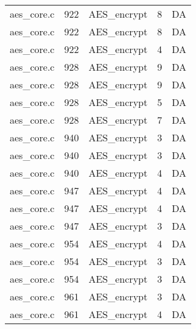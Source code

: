 \begin{table*}
\begin{tabular}{clrrr}
aes\_core.c&922&AES\_encrypt&8 &DA\\
aes\_core.c&922&AES\_encrypt&8 &DA\\
aes\_core.c&922&AES\_encrypt&4 &DA\\
aes\_core.c&928&AES\_encrypt&9 &DA\\
aes\_core.c&928&AES\_encrypt&9 &DA\\
aes\_core.c&928&AES\_encrypt&5 &DA\\
aes\_core.c&928&AES\_encrypt&7 &DA\\
aes\_core.c&940&AES\_encrypt&3 &DA\\
aes\_core.c&940&AES\_encrypt&3 &DA\\
aes\_core.c&940&AES\_encrypt&4 &DA\\
aes\_core.c&947&AES\_encrypt&4 &DA\\
aes\_core.c&947&AES\_encrypt&4 &DA\\
aes\_core.c&947&AES\_encrypt&3 &DA\\
aes\_core.c&954&AES\_encrypt&4 &DA\\
aes\_core.c&954&AES\_encrypt&3 &DA\\
aes\_core.c&954&AES\_encrypt&3 &DA\\
aes\_core.c&961&AES\_encrypt&3 &DA\\
aes\_core.c&961&AES\_encrypt&4 &DA\\
\hline
\end{tabular}
\end{table*}